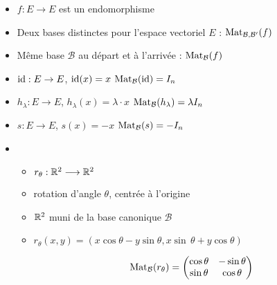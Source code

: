 \begin{frame}

\begin{itemize}

  \item $f : E \to E$ est un endomorphisme
  \pause
  \item Deux bases distinctes pour l'espace vectoriel $E$ : $\mathop{\text{Mat}}\nolimits_{\mathcal{B},\mathcal{B}'} (f)$
  \pause  
  \item Même base $\mathcal{B}$ au départ et à l'arrivée : $\mathop{\text{Mat}}\nolimits_{\mathcal{B}} (f)$

\end{itemize}

\pause
\begin{exemple}
\begin{itemize}
  \item {} $\mathop{\text{id}}\nolimits : E \to E$, $\mathop{\text{id}}\nolimits(x)=x$ 
\hfill\pause
  $\mathop{\text{Mat}}\nolimits_{\mathcal{B}} (\mathop{\text{id}}\nolimits) = I_n$
\hspace*{1em}

\pause
  \item {} $h_\lambda : E \to E$, $h_\lambda(x) = \lambda \cdot x$
\hfill\pause
  $\mathop{\text{Mat}}\nolimits_{\mathcal{B}} (h_\lambda) = \lambda I_n$
\hspace*{1em}

\pause
  \item {} $s : E \to E$, $s(x) = - x$ 
\hfill\pause
  $\mathop{\text{Mat}}\nolimits_{\mathcal{B}} (s) = - I_n$
\hspace*{1em}
  
  \pause
  \item {}   
  \begin{itemize}
    \item $r_\theta : \mathbb{R}^2 \longrightarrow \mathbb{R}^2$
    \pause
    \item rotation d'angle $\theta$, centrée à l'origine 
    \pause
    \item $\mathbb{R}^2$ muni de la base canonique $\mathcal{B}$
    \pause
    \item $r_\theta (x,y) = (x \cos  \theta - y \sin\theta,x\sin \, \theta + y \cos\theta)$
    \pause
    
$$\mathop{\text{Mat}}\nolimits_{\mathcal{B}} (r_\theta) = 
  \begin{pmatrix}
\cos\theta & -\sin\theta\\
\sin\theta & \cos\theta
\end{pmatrix}$$
  \end{itemize} 
\end{itemize}
  
\end{exemple}
\end{frame}

